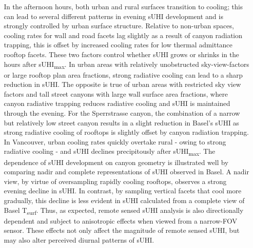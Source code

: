 \begin{bibunit}
In the afternoon hours, both urban and rural surfaces transition to cooling; this can lead to several different patterns in evening sUHI development and is strongly controlled by urban surface structure. Relative to non-urban spaces, cooling rates for wall and road facets lag slightly as a result of canyon radiation trapping, this is offset by increased cooling rates for low thermal admittance rooftop facets. These two factors control whether sUHI grows or shrinks in the hours after sUHI\textsubscript{max}. In urban areas with relatively unobstructed sky-view-factors or large rooftop plan area fractions, strong radiative cooling can lead to a sharp reduction in sUHI. The opposite is true of urban areas with restricted sky view factors and tall street canyons with large wall surface area fractions, where canyon radiative trapping reduces radiative cooling and sUHI is maintained through the evening. For the Sperrstrasse canyon, the combination of a narrow but relatively low street canyon results in a slight reduction in Basel's sUHI as strong radiative cooling of rooftops is slightly offset by canyon radiation trapping. In Vancouver, urban cooling rates quickly overtake rural - owing to strong radiative cooling - and sUHI declines precipitously after sUHI\textsubscript{max}. The dependence of sUHI development on canyon geometry is illustrated well by comparing nadir and complete representations of sUHI observed in Basel. A nadir view, by virtue of oversampling rapidly cooling rooftops, observes a strong evening decline in sUHI. In contrast, by sampling vertical facets that cool more gradually, this decline is less evident in sUHI calculated from a complete view of Basel T\textsubscript{surf}. Thus, as expected, remote sensed sUHI analysis is also directionally dependent and subject to anisotropic effects when viewed from a narrow-FOV sensor. These effects not only affect the magnitude of remote sensed sUHI, but may also alter perceived diurnal patterns of sUHI. 
 

\end{bibunit}
